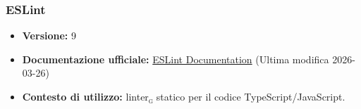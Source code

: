 \documentclass[a4paper, 11pt, oneside]{scrartcl}
\begin{document}
\subsubsection{ESLint}
\begin{itemize}[noitemsep]
    \item \textbf{Versione:} 9
    \item \textbf{Documentazione ufficiale:} \href{https://eslint.org/docs/latest/}{ESLint Documentation} (Ultima modifica 2026-03-26)
    \item \textbf{Contesto di utilizzo:} linter\textsubscript{\textsc{g}} statico per il codice TypeScript/JavaScript.
\end{itemize}



\newpage
%

\newpage
%

\newpage
%

\newpage
%

\newpage
%

\newpage
%
\end{document}
